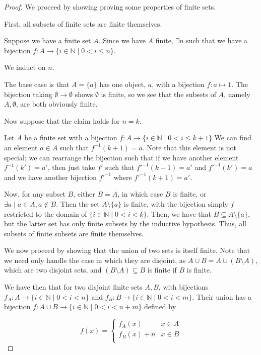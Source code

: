\documentclass[12pt,letterpaper]{article}
\theoremstyle{definition}
\newcommand{\N}{\mathbb{N}}
\begin{document}
\begin{proof}
    We proceed by showing proving some properties of finite sets.

    First, all subsets of finite sets are finite themselves.
    
    Suppose we have a finite set $A$.
    Since we have $A$ finite, $\exists n$ such that we have a bijection 
    $f: A \rightarrow \{i \in \N \mid 0 < i \leq n\}$.
    
    We induct on $n$.

    The base case is that $A = \{a\}$ has one object, $a$, with a bijection $f: a \mapsto 1$. 
    The bijection taking $\emptyset \rightarrow \emptyset$ shows $\emptyset$ is finite, so
    we see that the subsets of $A$, namely $A, \emptyset$, are both obviously finite.

    Now suppose that the claim holds for $n = k$.

    Let $A$ be a finite set with a bijection $f: A \rightarrow \{i \in \N \mid 0 < i \leq k+1\}$
    We can find an element $a \in A$ such that $f^{-1}(k+1) = a$.
    Note that this element is not special; we can rearrange the bijection such that
    if we have another element $f^{-1}(k') = a'$, then just take $f'$ such that $f'^{-1}(k+1) = a'$
    and $f'^{-1}(k') = a$ and we have another bijection $f'^{-1}$ where $f'^{-1}(k+1) = a'$.

    Now, for any subset $B$, either $B = A$, in which case $B$ is finite, or $\exists a \mid a \in A, a \notin B$. Then
    the set $A \setminus \{a\}$ is finite, with the bijection simply $f$ restricted to
    the domain of $\{i \in \N \mid 0 < i < k\}$. 
    Then, we have that $B \subseteq A \setminus \{a\}$, but the latter set has only finite
    subsets by the inductive hypothesis.
    Thus, all subsets of finite subsets are finite themselves.

    We now proceed by showing that the union of two sets is itself finite.
    Note that we need only handle the case in which they are disjoint, as $A \cup B = A \cup (B \setminus A)$,
    which are two disjoint sets, and $(B \setminus A) \subseteq B$ is finite if $B$ is finite.

    We have then that for two disjoint finite sets $A, B$, with bijections
    $f_A: A \rightarrow \{i \in \N \mid 0 < i < n\}$ and $f_B: B \rightarrow \{i \in \N \mid 0 < i < m\}$.
    Their union has a bijection $f: A\cup B \rightarrow \{i \in \N \mid 0 < i < n+m\}$
    defined by

    \[
    f(x) = \begin{cases}
        f_A(x) & x \in A \\
        f_B(x) + n & x \in B \\
    \end{cases}
    \]


\end{proof}
\end{document}
